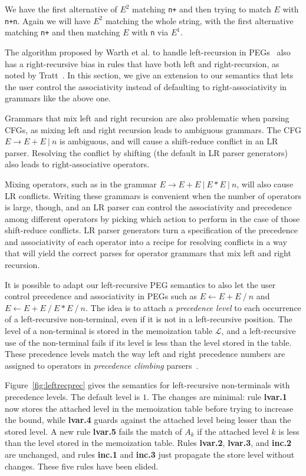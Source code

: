 We have the first alternative of $E^2$ matching {\tt n+} and then
trying to match $E$ with {\tt n+n}. Again we will have $E^2$ matching
the whole string, with the first alternative matching {\tt n+} and
then matching $E$ with {\tt n} via $E^1$. 

The algorithm proposed by Warth et al.
to handle left-recursion in PEGs~\cite{warth:left} also has a right-recursive
bias in rules that have both left and right-recursion, 
as noted by Tratt~\cite{tratt:left}. In this section, we give an extension
to our semantics that lets the user control the associativity instead of
defaulting to right-associativity in grammars like the above one.

Grammars that mix left and right recursion are also problematic
when parsing CFGs, as mixing left and right recursion leads to
ambiguous grammars. The CFG $E \rightarrow E+E \ |\ n$ is ambiguous,
and will cause a shift-reduce conflict in an LR parser.
Resolving the conflict by shifting (the default in LR parser
generators) also leads to right-associative operators.

Mixing operators, such as in
the grammar $E \rightarrow E+E \ |\ E*E \ |\ n$, will also cause
LR conflicts. Writing these grammars is convenient when the number of
operators is large, though, and an LR parser can control the
associativity and precedence among different operators by picking
which action to perform in the case of those shift-reduce
conflicts. LR parser generators turn a specification of the
precedence and associativity of each operator into a recipe for
resolving conflicts in a way that will yield the correct parses for
operator grammars that mix left and right recursion.

It is possible to adapt our left-recursive PEG semantics to also let
the user control precedence and associativity in PEGs such as $E
\leftarrow E+E \ /\ n$ and $E \leftarrow E+E \ /\ E*E \ /\ n$. The
idea is to attach a {\em precedence level} to each occurrence of a
left-recursive non-terminal, even if it is not in a left-recursive
position. The level of a non-terminal is stored in the memoization table $\mathcal{L}$,
and a left-recursive use of the non-terminal fails if its level is less
than the level stored in the table. These precedence levels match the way
left and right precedence numbers are assigned to operators in {\em precedence
climbing} parsers~\cite{hanson:prec}.

Figure~\ref{fig:leftrecprec} gives the semantics for left-recursive
non-terminals with precedence levels.  The default level is $1$.
The changes are minimal: rule {\bf lvar.1} now stores the attached
level in the memoization table before trying to increase the bound,
while {\bf lvar.4} guards against the attached level being lesser than
the stored level. A new rule {\bf lvar.5} fails the match of $A_k$ if
the attached level $k$ is less than the level stored in the memoization
table. Rules {\bf lvar.2}, {\bf lvar.3}, and {\bf inc.2} are unchanged,
and rules {\bf inc.1} and {\bf inc.3} just propagate the store level
without changes. These five rules have been elided.

